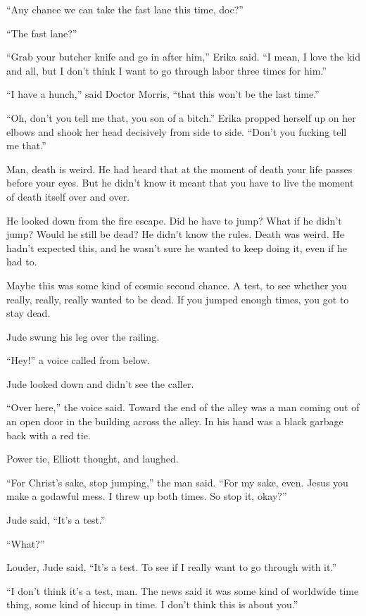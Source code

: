 ``Any chance we can take the fast lane this time, doc?''

``The fast lane?''

``Grab your butcher knife and go in after him,'' Erika said. ``I mean, I love the kid and all, but I don't think I want to go through labor three times for him.''

``I have a hunch,'' said Doctor Morris, ``that this won't be the last time.''

``Oh, don't you tell me that, you son of a bitch.'' Erika propped herself up on her elbows and shook her head decisively from side to side. ``Don't you fucking tell me that.''




 Man, death is weird. He had heard that at the moment of death your life passes before your eyes. But he didn't know it meant that you have to live the moment of death itself over and over.

He looked down from the fire escape. Did he have to jump? What if he didn't jump? Would he still be dead? He didn't know the rules. Death was weird. He hadn't expected this, and he wasn't sure he wanted to keep doing it, even if he had to.

Maybe this was some kind of cosmic second chance. A test, to see whether you really, really, really wanted to be dead. If you jumped enough times, you got to stay dead.

Jude swung his leg over the railing.

``Hey!'' a voice called from below.

Jude looked down and didn't see the caller.

``Over here,'' the voice said. Toward the end of the alley was a man coming out of an open door in the building across the alley. In his hand was a black garbage back with a red tie.

Power tie, Elliott thought, and laughed.

``For Christ's sake, stop jumping,'' the man said. ``For my sake, even. Jesus you make a godawful mess. I threw up both times. So stop it, okay?''

Jude said, ``It's a test.''

``What?''

Louder, Jude said, ``It's a test. To see if I really want to go through with it.''

``I don't think it's a test, man. The news said it was some kind of worldwide time thing, some kind of hiccup in time. I don't think this is about you.''

